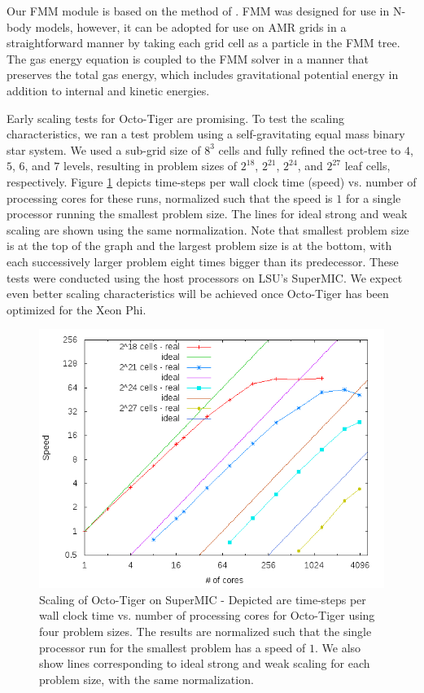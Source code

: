 \documentclass[preprint]{aastex}
\begin{document}
{Our FMM module is based on the method of \cite{D2000}. FMM was designed for use in N-body models, however, it can be adopted for use on AMR grids in a straightforward manner by taking each grid cell
as a particle in the FMM tree.  The gas energy equation is coupled to the 
FMM solver in a manner that preserves the total gas energy, which includes gravitational potential
energy in addition to internal and kinetic energies. 

Early scaling tests for Octo-Tiger are promising. To test the scaling characteristics, we ran a test problem using a self-gravitating equal mass binary star system. We used a sub-grid size of $8^3$ cells and fully refined
the oct-tree to $4$, $5$, $6$, and $7$ levels, resulting in problem sizes of $2^{18}$, $2^{21}$, $2^{24}$, and $2^{27}$ leaf cells, respectively. Figure \ref{scaling} depicts time-steps per wall clock time (speed) vs. number of processing cores for 
these runs, normalized such that the speed is $1$ for a single processor running the smallest problem size. The lines for ideal strong and weak scaling are shown using the same normalization. Note that smallest problem
size is at the top of the graph and the largest problem size is at the bottom, with each successively larger problem eight times bigger than its predecessor. These tests were conducted using the host processors
on LSU's SuperMIC. We expect even better scaling characteristics will be achieved once Octo-Tiger has been optimized for the Xeon Phi.


\begin{figure}[h]
\centering
\includegraphics[scale=0.75]{./scaling.png}
\caption{Scaling of Octo-Tiger on SuperMIC - Depicted are time-steps per wall clock time vs. number of processing cores for Octo-Tiger using four problem sizes. 
The results are normalized such that the single processor run for the smallest problem has a speed of $1$. We also
show lines corresponding to ideal strong and weak scaling for each problem size, with the same normalization. }
\label{scaling}
\end{figure}


}
\end{document}
